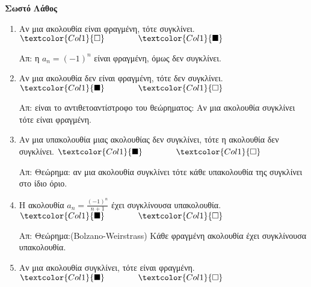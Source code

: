 



\pagestyle{vangelis}




\begin{center}
  \minibox{\large\bfseries \textcolor{Col2}{Ακολουθίες (Ερωτήσεις)}}
\end{center}


\vspace{\baselineskip}

\hfill \textcolor{Col1}{\textbf{Σωστό}} \quad \textcolor{Col1}{\textbf{Λάθος}}
\begin{enumerate}[itemsep=.5\baselineskip]
  \item \textcolor{Col1}{Αν μια ακολουθία είναι φραγμένη, τότε συγκλίνει}. 
    \hfill $\textcolor{Col1}{\square} \qquad \qquad \textcolor{Col1}{\blacksquare}$

    Απ: η $ a_{n}=(-1)^{n} $ είναι φραγμένη, όμως δεν συγκλίνει. 

  \item \textcolor{Col1}{Αν μια ακολουθία δεν είναι φραγμένη, τότε δεν συγκλίνει}.
    \hfill $\textcolor{Col1}{\blacksquare} \qquad \qquad \textcolor{Col1}{\square}$

    Απ: είναι το αντιθετοαντίστροφο του θεώρηματος: Αν μια ακολουθία συγκλίνει τότε 
    είναι φραγμένη. 

  \item \textcolor{Col1}{Αν μια υπακολουθία μιας ακολουθίας δεν συγκλίνει, τότε η
    ακολουθία δεν συγκλίνει}.
    \hfill $\textcolor{Col1}{\blacksquare} \qquad \qquad \textcolor{Col1}{\square}$

    Απ: Θεώρημα: αν μια ακολουθία συγκλίνει τότε κάθε υπακολουθία της συγκλίνει 
    στο ίδιο όριο. 

  \item \textcolor{Col1}{Η ακολουθία $ a_{n}= \frac{(-1)^{n}}{n+1} $ έχει συγκλίνουσα
    υπακολουθία}.
    \hfill $\textcolor{Col1}{\blacksquare} \qquad \qquad \textcolor{Col1}{\square}$

    Απ: Θεώρημα:(Bolzano-Weirstrass) Κάθε φραγμένη ακολουθία έχει συγκλίνουσα 
    υπακολουθία. 

  \item \textcolor{Col1}{Αν μια ακολουθία συγκλίνει, τότε είναι φραγμένη}.
    \hfill $\textcolor{Col1}{\blacksquare} \qquad \qquad \textcolor{Col1}{\square}$


\end{enumerate}
